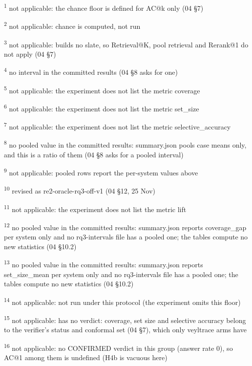 \par\raggedright\noindent
\textsuperscript{1} not applicable: the chance floor is defined for AC@k only (04 \S{}7)\par
\textsuperscript{2} not applicable: chance is computed, not run\par
\textsuperscript{3} not applicable: builds no slate, so Retrieval@K, pool retrieval and Rerank@1 do not apply (04 \S{}7)\par
\textsuperscript{4} no interval in the committed results (04 \S{}8 asks for one)\par
\textsuperscript{5} not applicable: the experiment does not list the metric coverage\par
\textsuperscript{6} not applicable: the experiment does not list the metric set\_size\par
\textsuperscript{7} not applicable: the experiment does not list the metric selective\_accuracy\par
\textsuperscript{8} no pooled value in the committed results: summary.json pools case means only, and this is a ratio of them (04 \S{}8 asks for a pooled interval)\par
\textsuperscript{9} not applicable: pooled rows report the per-system values above\par
\textsuperscript{10} revised as re2-oracle-rq3-off-v1 (04 \S{}12, 25 Nov)\par
\textsuperscript{11} not applicable: the experiment does not list the metric lift\par
\textsuperscript{12} no pooled value in the committed results: summary.json reports coverage\_gap per system only and no rq3-intervals file has a pooled one; the tables compute no new statistics (04 \S{}10.2)\par
\textsuperscript{13} no pooled value in the committed results: summary.json reports set\_size\_mean per system only and no rq3-intervals file has a pooled one; the tables compute no new statistics (04 \S{}10.2)\par
\textsuperscript{14} not applicable: not run under this protocol (the experiment omits this floor)\par
\textsuperscript{15} not applicable: has no verdict: coverage, set size and selective accuracy belong to the verifier's status and conformal set (04 \S{}7), which only veyltrace arms have\par
\textsuperscript{16} not applicable: no CONFIRMED verdict in this group (answer rate 0), so AC@1 among them is undefined (H4b is vacuous here)\par
